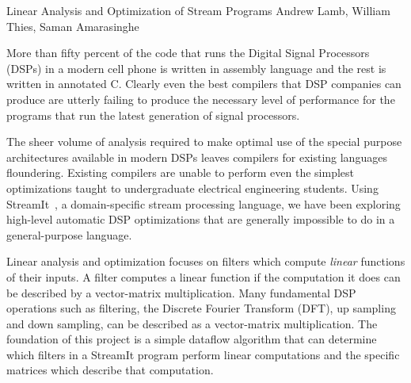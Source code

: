 

\formattitlecontents 
{Linear Analysis and Optimization of Stream Programs}
{Andrew Lamb, William Thies, Saman Amarasinghe}


%
More than fifty percent of the code that runs the Digital Signal Processors
(DSPs) in a modern cell phone is written in assembly language and the 
rest is written in annotated C\cite{gass-talk}. Clearly even the best 
compilers that DSP companies can produce are utterly failing to produce
the necessary level of performance for the programs that run the latest generation
of signal processors.

The sheer volume of analysis required to make optimal use of the special 
purpose architectures available in modern DSPs leaves compilers for existing languages 
floundering. Existing compilers are unable to perform even the simplest 
optimizations taught to undergraduate electrical engineering students. Using 
StreamIt~\cite{streamitcc}, 
a domain-specific stream processing language, we have been exploring
high-level automatic DSP optimizations that are generally impossible
to do in a general-purpose language.


Linear analysis and optimization\cite{pldi-03-linear} focuses on
filters which compute {\it linear} functions of their inputs. A filter
computes a linear function if the computation it does can be described
by a vector-matrix multiplication.  Many fundamental DSP operations
such as filtering, the Discrete Fourier Transform (DFT), up sampling
and down sampling, can be described as a vector-matrix
multiplication. The foundation of this project is a simple dataflow
algorithm that can determine which filters in a StreamIt program
perform linear computations and the specific matrices which describe
that computation.

